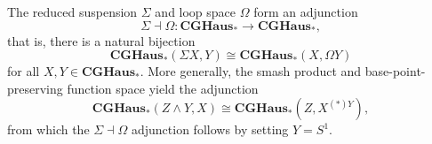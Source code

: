 The reduced suspension $\Sigma$ and loop space $\Omega$ form an adjunction
$$\Sigma \dashv \Omega: \mathbf{CGHaus}_* \to \mathbf{CGHaus}_*,$$
that is, there is a natural bijection
$$\mathbf{CGHaus}_*(\Sigma X, Y) \cong \mathbf{CGHaus}_*(X, \Omega Y)$$
for all $X, Y \in \mathbf{CGHaus}_*$. More generally, the smash product and base-point-preserving function space yield the adjunction
$$\mathbf{CGHaus}_*(Z \wedge Y, X) \cong \mathbf{CGHaus}_*(Z, X^{(*)Y}),$$
from which the $\Sigma \dashv \Omega$ adjunction follows by setting $Y = S^1$.
